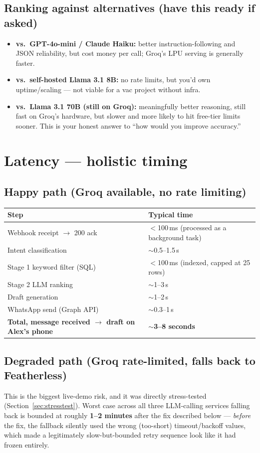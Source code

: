 \documentclass[11pt, a4paper]{article}
\begin{document}
\subsection{Ranking against alternatives (have this ready if asked)}
\begin{itemize}
    \item \textbf{vs.\ GPT-4o-mini / Claude Haiku:} better instruction-following and JSON reliability, but cost money per call; Groq's LPU serving is generally faster.
    \item \textbf{vs.\ self-hosted Llama 3.1 8B:} no rate limits, but you'd own uptime/scaling --- not viable for a vac project without infra.
    \item \textbf{vs.\ Llama 3.1 70B (still on Groq):} meaningfully better reasoning, still fast on Groq's hardware, but slower and more likely to hit free-tier limits sooner. This is your honest answer to ``how would you improve accuracy.''
\end{itemize}

\section{Latency --- holistic timing}

\subsection{Happy path (Groq available, no rate limiting)}
\begin{longtable}{@{}p{8cm}p{4cm}@{}}
\toprule
Step & Typical time \\
\midrule
\endhead
Webhook receipt $\to$ 200 ack & $<$100\,ms (processed as a background task) \\
Intent classification & $\sim$0.5--1.5\,s \\
Stage 1 keyword filter (SQL) & $<$100\,ms (indexed, capped at 25 rows) \\
Stage 2 LLM ranking & $\sim$1--3\,s \\
Draft generation & $\sim$1--2\,s \\
WhatsApp send (Graph API) & $\sim$0.3--1\,s \\
\midrule
\textbf{Total, message received $\to$ draft on Alex's phone} & \textbf{$\sim$3--8 seconds} \\
\bottomrule
\end{longtable}

\subsection{Degraded path (Groq rate-limited, falls back to Featherless)}
This is the biggest live-demo risk, and it was directly stress-tested (Section~\ref{sec:stresstest}). Worst case across all three LLM-calling services falling back is bounded at roughly \textbf{1--2 minutes} after the fix described below --- \emph{before} the fix, the fallback silently used the wrong (too-short) timeout/backoff values, which made a legitimately slow-but-bounded retry sequence look like it had frozen entirely.
\end{document}
